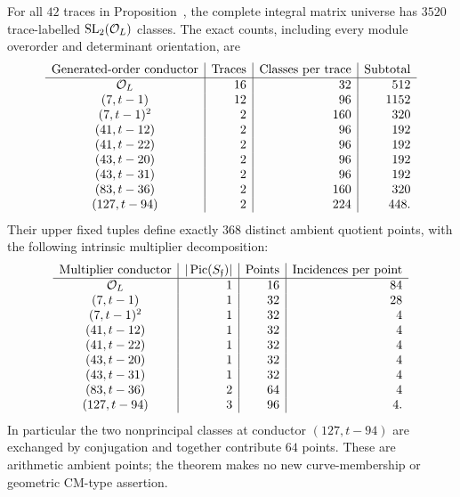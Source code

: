 \begin{theorem}
\label{thm:fullpacketarithmetic}
For all $42$ traces in Proposition~, the
complete integral matrix universe has $3520$ trace-labelled
$\operatorname{SL}_2(\mathcal O_L)$ classes.  The exact counts, including every module
overorder and determinant orientation, are
\[
\begin{array}{c|r|r|r}
\text{Generated-order conductor}&\text{Traces}&
 \text{Classes per trace}&\text{Subtotal}\\\hline
\mathcal O_L&16&32&512\\
(7,t-1)&12&96&1152\\
(7,t-1)^2&2&160&320\\
(41,t-12)&2&96&192\\
(41,t-22)&2&96&192\\
(43,t-20)&2&96&192\\
(43,t-31)&2&96&192\\
(83,t-36)&2&160&320\\
(127,t-94)&2&224&448.
\end{array}
\]
Their upper fixed tuples define exactly $368$ distinct ambient
quotient points, with the following intrinsic multiplier decomposition:
\[
\begin{array}{c|r|r|r}
\text{Multiplier conductor}&|\operatorname{Pic}(S_{\mathfrak f})|&
 \text{Points}&\text{Incidences per point}\\\hline
\mathcal O_L&1&16&84\\
(7,t-1)&1&32&28\\
(7,t-1)^2&1&32&4\\
(41,t-12)&1&32&4\\
(41,t-22)&1&32&4\\
(43,t-20)&1&32&4\\
(43,t-31)&1&32&4\\
(83,t-36)&2&64&4\\
(127,t-94)&3&96&4.
\end{array}
\]
In particular the two nonprincipal classes at conductor $(127,t-94)$
are exchanged by conjugation and together contribute $64$ points.
These are arithmetic ambient points; the theorem makes no new
curve-membership or geometric CM-type assertion.
\end{theorem}
